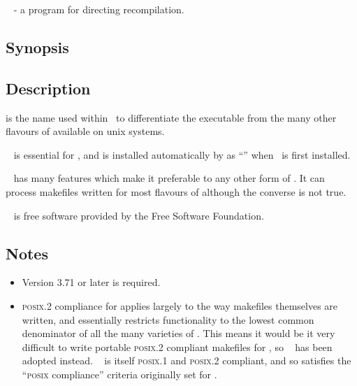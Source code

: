 

\gnu\  - a program for directing recompilation.

\subsection*{Synopsis}

\begin{synopsis}
\end{synopsis}

\subsection*{Description}

 is the name used within \aipspp\ to differentiate the \gnu
{} executable from the many other flavours of  available
on unix systems.

\gnu\  is essential for \aipspp, and is installed automatically
by  as ``'' when \aipspp\ is first installed.

\gnu\  has many features which make it preferable to any other
form of .  It can process makefiles written for most flavours of
 although the converse is not true.

\gnu\  is free software provided by the Free Software
Foundation.

\subsection*{Notes}

\begin{itemize}
\item
   Version 3.71 or later is required.

\item
   \textsc{posix.2} compliance for  applies largely to the way
   makefiles themselves are written, and essentially restricts functionality
   to the lowest common denominator of all the many varieties of
   .  This means it would be it very difficult to write portable
   \textsc{posix.2} compliant makefiles for \aipspp, so \gnu\  has
   been adopted instead.  \gnu\  is itself \textsc{posix.1} and
   \textsc{posix.2} compliant, and so satisfies the ``\textsc{posix}
   compliance'' criteria originally set for \aipspp.
\end{itemize}

